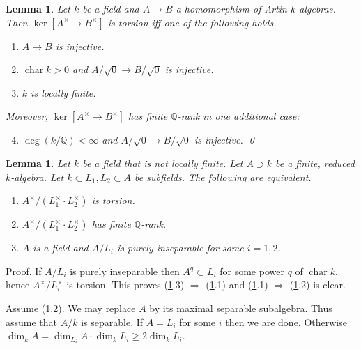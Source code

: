 \documentclass{amsart}
\newtheorem{lem}[thm]{Lemma}
\theoremstyle{definition}
\theoremstyle{remark}
\newcommand{\q}[0]{{\mathbb Q}}
\newcommand{\chr}[0]{\operatorname{char}}
\begin{document}
\begin{lem} \label{ker.fin.Qrank.lem}
Let $k$ be a field and $A\to B$ a homomorphism of Artin $k$-algebras.  Then  $\ker[A^{\times}\to B^{\times}]$ is torsion iff one of the following holds. 
\begin{enumerate}
\item $A\to B$ is  injective.
\item $\chr k>0$ and $A/\sqrt{0}\to B/\sqrt{0}$ is injective.
\item $k$ is locally finite. 
\end{enumerate}
Moreover, $\ker[A^{\times}\to B^{\times}]$ has finite $\q$-rank in one additional case:
\begin{enumerate}\setcounter{enumi}{3}
 \item $\deg (k/\q)<\infty$ and  $A/\sqrt{0}\to B/\sqrt{0}$ is injective. \qed
\end{enumerate}
\end{lem}







\begin{lem} \label{2.fields.mult.gen.lem}
Let $k$ be a field that is not locally finite. 
Let  $A\supset k$ be a finite, reduced $k$-algebra. 
Let  $k\subset L_1, L_2\subset A$ be subfields.  The following are equivalent. 
\begin{enumerate}
\item $A^\times/(L_1^\times\cdot L_2^\times)$ is torsion.
\item $A^\times/(L_1^\times\cdot L_2^\times)$ has finite $\q$-rank.
\item $A$ is a field and $A/L_i$  is purely inseparable for some $i=1,2$. 
\end{enumerate}
\end{lem}

Proof.  If  $A/L_i$  is purely inseparable then $A^q\subset L_i$ for some
power $q$ of $\chr k$, hence $A^\times/L_i^\times$ is torsion. This proves
(\ref{2.fields.mult.gen.lem}.3) $\Rightarrow$ (\ref{2.fields.mult.gen.lem}.1) and  (\ref{2.fields.mult.gen.lem}.1) $\Rightarrow$ (\ref{2.fields.mult.gen.lem}.2) is clear. 

Assume (\ref{2.fields.mult.gen.lem}.2). We may replace $A$ by its maximal separable subalgebra.
Thus assume that $A/k$ is separable.  If $A=L_i$ for some $i$ then we are done.
Otherwise
$\dim_k A=\dim_{L_i}A\cdot \dim_kL_i\geq 2\dim_kL_i$. 
\end{document}
